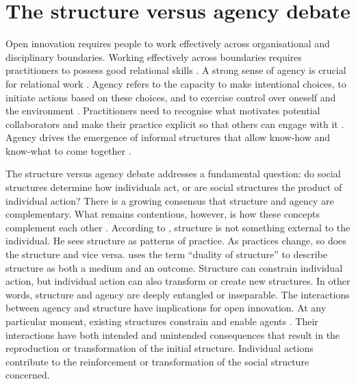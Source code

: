 \section{The structure versus agency debate}

Open innovation requires people to work effectively across organisational and disciplinary boundaries. Working effectively across boundaries requires practitioners to possess good relational skills \citep{chesbrough2012open}. A strong sense of agency is crucial for relational work \citep{edwards2017working}. Agency refers to the capacity to make intentional choices, to initiate actions based on these choices, and to exercise control over oneself and the environment \citep{goller2017human}. Practitioners need to recognise what motivates potential collaborators and make their practice explicit so that others can engage with it \citep{edwards2017working}. Agency drives the emergence of informal structures that allow know-how and know-what to come together \citep{lam2014tacit, hubrich2015embodiment}. \medskip

The structure versus agency debate addresses a fundamental question: do social structures determine how individuals act, or are social structures the product of individual action? There is a growing consensus that structure and agency are complementary. What remains contentious, however, is how these concepts complement each other \citep{tan2011understanding}. According to \citet{giddens1984constitution}, structure is not something external to the individual. He sees structure as patterns of practice. As practices change, so does the structure and vice versa. \citet{giddens1984constitution} uses the term \enquote{duality of structure} to describe structure as both a medium and an outcome. Structure can constrain individual action, but individual action can also transform or create new structures. In other words, structure and agency are deeply entangled or inseparable. The interactions between agency and structure have implications for open innovation. At any particular moment, existing structures constrain and enable agents \citep{emirbayer1998agency}. Their interactions have both intended and unintended consequences that result in the reproduction or transformation of the initial structure. Individual actions contribute to the reinforcement or transformation of the social structure concerned. \medskip

